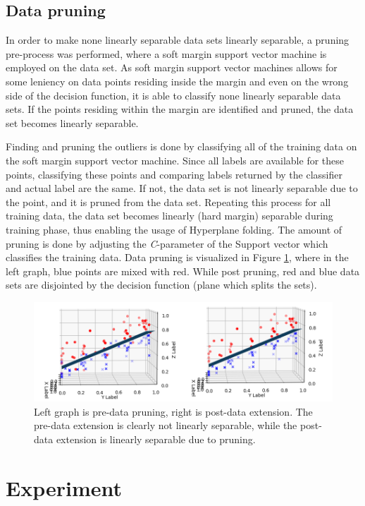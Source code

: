 \documentclass[a4paper,twoside]{bth}
\begin{document}
\subsection{Data pruning}
In order to make none linearly separable data sets linearly separable, a pruning pre-process was performed, where a soft margin support vector machine is employed on the data set. As soft margin support vector machines allows for some leniency on data points residing inside the margin and even on the wrong side of the decision function, it is able to classify none linearly separable data sets. If the points residing within the margin are identified and pruned, the data set becomes linearly separable.\par
Finding and pruning the outliers is done by classifying all of the training data on the soft margin support vector machine. Since all labels are available for these points, classifying these points and comparing  labels returned by the classifier and actual label are the same. If not, the data set is not linearly separable due to the point, and it is pruned from the data set. Repeating this process for all training data, the data set becomes linearly (hard margin) separable during training phase, thus enabling the usage of Hyperplane folding. The amount of pruning is done by adjusting the \textit{C}-parameter of the Support vector which classifies the training data. Data pruning is visualized in Figure \ref{fig:prune}, where in the left graph, blue points are mixed with red. While post pruning, red and blue data sets are disjointed by the decision function (plane which splits the sets).

\begin{figure}
\centering
\includegraphics[scale=0.75]{images/metod-images/clean.png}
   \caption{Left graph is pre-data pruning, right is post-data extension. The pre-data extension is clearly not linearly separable, while the post-data extension is linearly separable due to pruning. }
   \label{fig:prune}
\end{figure}

\section{Experiment}
\end{document}
